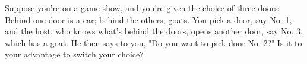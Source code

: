 Suppose you're on a game show, and you're given the choice of three doors:
Behind one door is a car; behind the others, goats. You pick a door, say No. 1,
and the host, who knows what's behind the doors, opens another door, say No. 3,
which has a goat. He then says to you, "Do you want to pick door No. 2?" Is it
to your advantage to switch your choice?





